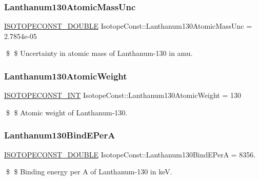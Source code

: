 \subsubsection{\texorpdfstring{Lanthanum130\+Atomic\+Mass\+Unc}{Lanthanum130AtomicMassUnc}}
{\footnotesize\ttfamily \mbox{\hyperlink{group___isotope_const-_macros_ga8f45a7272ce02c0b4c65c44636ed719a}{I\+S\+O\+T\+O\+P\+E\+C\+O\+N\+S\+T\+\_\+\+D\+O\+U\+B\+LE}} Isotope\+Const\+::\+Lanthanum130\+Atomic\+Mass\+Unc = 2.\+7854e-\/05}

\$ \$ Uncertainty in atomic mass of Lanthanum-\/130 in amu. \mbox{\label{group___isotope_const-_lanthanum-_la130_ga3e22be0678e37a3e1796c0858b0c382f}} 
\subsubsection{\texorpdfstring{Lanthanum130\+Atomic\+Weight}{Lanthanum130AtomicWeight}}
{\footnotesize\ttfamily \mbox{\hyperlink{group___isotope_const-_macros_ga5f18360b3e99483a35c32d789e62621c}{I\+S\+O\+T\+O\+P\+E\+C\+O\+N\+S\+T\+\_\+\+I\+NT}} Isotope\+Const\+::\+Lanthanum130\+Atomic\+Weight = 130}

\$ \$ Atomic weight of Lanthanum-\/130. \mbox{\label{group___isotope_const-_lanthanum-_la130_ga79a578b0edc1eef10d044ae0e0d66bbc}} 
\subsubsection{\texorpdfstring{Lanthanum130\+Bind\+E\+PerA}{Lanthanum130BindEPerA}}
{\footnotesize\ttfamily \mbox{\hyperlink{group___isotope_const-_macros_ga8f45a7272ce02c0b4c65c44636ed719a}{I\+S\+O\+T\+O\+P\+E\+C\+O\+N\+S\+T\+\_\+\+D\+O\+U\+B\+LE}} Isotope\+Const\+::\+Lanthanum130\+Bind\+E\+PerA = 8356.}

\$ \$ Binding energy per A of Lanthanum-\/130 in keV. \mbox{\label{group___isotope_const-_lanthanum-_la130_ga9cb34cdfe243da8ee01630c6e843dc63}} 
